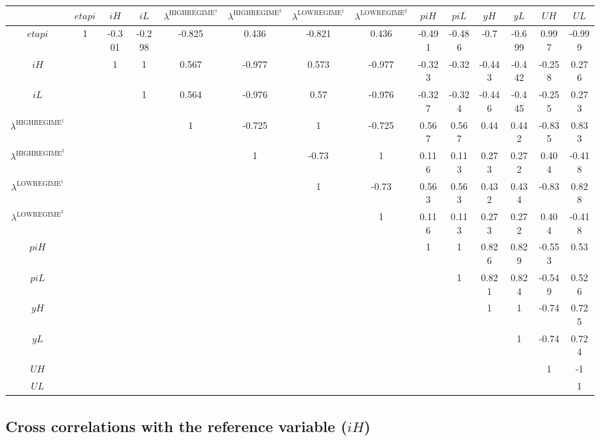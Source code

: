 \begin{tabular}{c|ccccccccccccc|}
  & ${e\!t\!a\!p\!i}$ & ${i\!H}$ & ${i\!L}$ & $\lambda^{\mathrm{HIGHREGIME}^{\mathrm{1}}}$ & $\lambda^{\mathrm{HIGHREGIME}^{\mathrm{2}}}$ & $\lambda^{\mathrm{LOWREGIME}^{\mathrm{1}}}$ & $\lambda^{\mathrm{LOWREGIME}^{\mathrm{2}}}$ & ${p\!i\!H}$ & ${p\!i\!L}$ & ${y\!H}$ & ${y\!L}$ & ${U\!H}$ & ${U\!L}$\\
\hline
${e\!t\!a\!p\!i}$ & 1 & -0.301 & -0.298 & -0.825 & 0.436 & -0.821 & 0.436 & -0.491 & -0.486 & -0.7 & -0.699 & 0.997 & -0.999 \\
${i\!H}$ &  & 1 & 1 & 0.567 & -0.977 & 0.573 & -0.977 & -0.323 & -0.32 & -0.443 & -0.442 & -0.258 & 0.276 \\
${i\!L}$ &  &  & 1 & 0.564 & -0.976 & 0.57 & -0.976 & -0.327 & -0.324 & -0.446 & -0.445 & -0.255 & 0.273 \\
$\lambda^{\mathrm{HIGHREGIME}^{\mathrm{1}}}$ &  &  &  & 1 & -0.725 & 1 & -0.725 & 0.567 & 0.567 & 0.44 & 0.442 & -0.835 & 0.833 \\
$\lambda^{\mathrm{HIGHREGIME}^{\mathrm{2}}}$ &  &  &  &  & 1 & -0.73 & 1 & 0.116 & 0.113 & 0.273 & 0.272 & 0.404 & -0.418 \\
$\lambda^{\mathrm{LOWREGIME}^{\mathrm{1}}}$ &  &  &  &  &  & 1 & -0.73 & 0.563 & 0.563 & 0.432 & 0.434 & -0.83 & 0.828 \\
$\lambda^{\mathrm{LOWREGIME}^{\mathrm{2}}}$ &  &  &  &  &  &  & 1 & 0.116 & 0.113 & 0.273 & 0.272 & 0.404 & -0.418 \\
${p\!i\!H}$ &  &  &  &  &  &  &  & 1 & 1 & 0.826 & 0.829 & -0.553 & 0.53 \\
${p\!i\!L}$ &  &  &  &  &  &  &  &  & 1 & 0.821 & 0.824 & -0.549 & 0.526 \\
${y\!H}$ &  &  &  &  &  &  &  &  &  & 1 & 1 & -0.74 & 0.725 \\
${y\!L}$ &  &  &  &  &  &  &  &  &  &  & 1 & -0.74 & 0.724 \\
${U\!H}$ &  &  &  &  &  &  &  &  &  &  &  & 1 & -1 \\
${U\!L}$ &  &  &  &  &  &  &  &  &  &  &  &  & 1 \\
\hline
\end{tabular}


\subsection{Cross correlations with the reference variable (${i\!H}$)}

